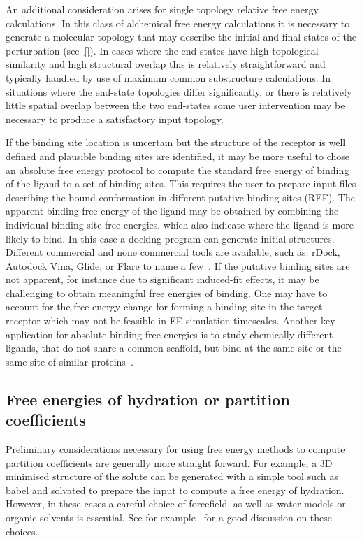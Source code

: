 \documentclass[9pt,bestpractices]{livecoms}
\begin{document}
An additional consideration arises for single topology relative free energy calculations. In this class of alchemical free energy calculations it is necessary to generate a molecular topology that may describe the initial and final states of the perturbation (see~\ref{}). In cases where the end-states have high topological similarity and high structural overlap this is relatively straightforward and typically handled by use of maximum common substructure calculations. In situations where the end-state topologies differ significantly, or there is relatively little spatial overlap between the two end-states some user intervention may be necessary to produce a satisfactory input topology.

If the binding site location is uncertain but the structure of the receptor is well defined and plausible binding sites are identified, it may be more useful to chose an absolute free energy protocol to compute the standard free energy of binding of the ligand to a set of binding sites. This requires the user to prepare input files describing the bound conformation in different putative binding sites (REF). The apparent binding free energy of the ligand may be obtained by combining the individual binding site free energies, which also indicate where the ligand is more likely to bind. In this case a docking program can generate initial structures. Different commercial and none commercial tools are available, such as: rDock, Autodock Vina, Glide, or Flare to name a few~\cite{ruiz-carmona2014rdock, trott2010autodock, friesner2004glide, cheeseright2006molecular}. 
If the putative binding sites are not apparent, for instance due to significant induced-fit effects, it may be challenging to obtain meaningful free energies of binding. One may have to account for the free energy change for forming a binding site in the target receptor which may not be feasible in FE simulation timescales. Another key application for absolute binding free energies is to study chemically different ligands, that do not share a common scaffold, but bind at the same site or the same site of similar proteins~\cite{aldeghi2015accurate}.  

\subsection*{Free energies of hydration or partition coefficients}
Preliminary considerations necessary for using free energy methods to compute partition coefficients are generally more straight forward. For example, a 3D minimised structure of the solute can be generated with a simple tool such as babel and solvated to prepare the input  to compute a free energy of hydration. However, in these cases a careful choice of forcefield, as well as water models or organic solvents is essential. See for example~\cite{bosisio2016blinded,rustenburg2016measuring} for a good discussion on these choices. 
\end{document}
